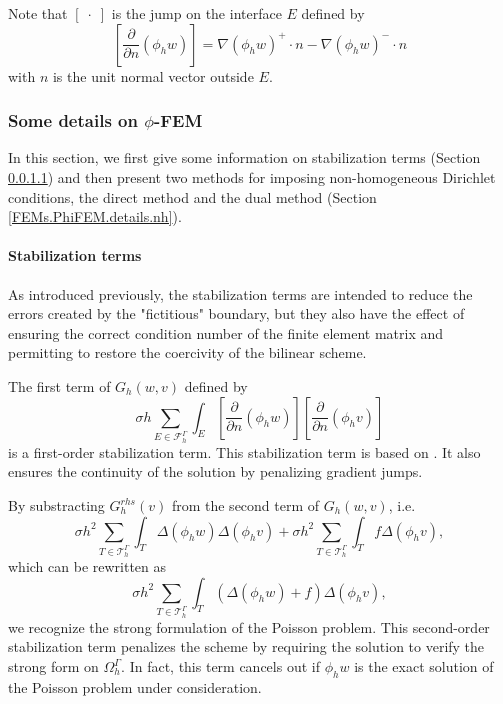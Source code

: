 \begin{Rem}
	Note that $[\;\cdot\;]$ is the jump on the interface $E$ defined by
	\begin{equation*}
		\left[\frac{\partial}{\partial n}(\phi_h w)\right]=\nabla(\phi_h w)^+\cdot n - \nabla(\phi_h w)^-\cdot n
	\end{equation*}
with $n$ is the unit normal vector outside $E$.
\end{Rem}

\subsubsection{Some details on $\phi$-FEM} \label{FEMs.PhiFEM.details}

In this section, we first give some information on stabilization terms (Section \ref{FEMs.PhiFEM.details.stab}) and then present two methods for imposing non-homogeneous Dirichlet conditions, the direct method and the dual method (Section \ref{FEMs.PhiFEM.details.nh}).

\paragraph{Stabilization terms} \label{FEMs.PhiFEM.details.stab}    

As introduced previously, the stabilization terms are intended to reduce the errors created by the "fictitious" boundary, but they also have the effect of ensuring the correct condition number of the finite element matrix and permitting to restore the coercivity of the bilinear scheme.                                                                                      

The first term of $G_h(w,v)$ defined by
\begin{equation*}
	\sigma h\sum_{E\in\mathcal{F}_h^\Gamma} \int_E \left[\frac{\partial}{\partial n}(\phi_h w)\right] \left[\frac{\partial}{\partial n}(\phi_h v)\right]
\end{equation*}
is a first-order stabilization term. This stabilization term is based on \cite{burman_ghost_2010}. It also ensures the continuity of the solution by penalizing gradient jumps.

By substracting $G_h^{rhs}(v)$ from the second term of $G_h(w,v)$, i.e.
\begin{equation*}
	\sigma h^2\sum_{T\in\mathcal{T}_h^\Gamma} \int_{T} \Delta(\phi_h w)\Delta(\phi_h v)+\sigma h^2\sum_{T\in\mathcal{T}_h^\Gamma} \int_{T} f \Delta(\phi_h v),
\end{equation*}
which can be rewritten as
\begin{equation*}
	\sigma h^2\sum_{T\in\mathcal{T}_h^\Gamma} \int_{T} \left(\Delta(\phi_h w)+f\right)\Delta(\phi_h v),
\end{equation*}
we recognize the strong formulation of the Poisson problem. This second-order stabilization term penalizes the scheme by requiring the solution to verify the strong form on $\Omega_h^\Gamma$. In fact, this term cancels out if $\phi_h w$ is the exact solution of the Poisson problem under consideration.


